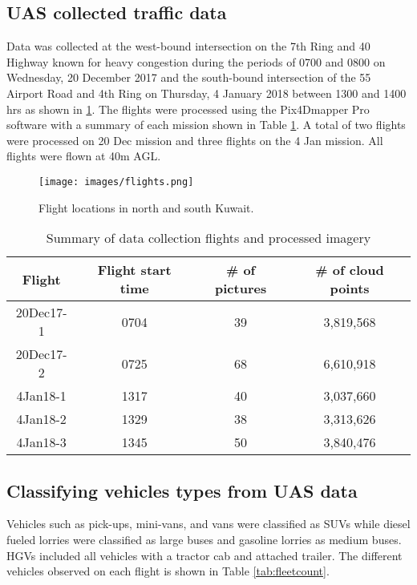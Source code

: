 \documentclass[preprint,12pt,a4paper,authoryear]{elsarticle}
\begin{document}
\begin{linenumbers}
\subsection{UAS collected traffic data}
Data was collected at the west-bound intersection on the 7th Ring and 40 Highway known for heavy congestion during the periods of 0700 and 0800 on Wednesday, 20 December 2017 and the south-bound intersection of the 55 Airport Road and 4th Ring on Thursday, 4 January 2018 between 1300 and 1400 hrs as shown in \ref{fig:flights}. The flights were processed using the Pix4Dmapper Pro software with a summary of  each mission shown in Table \ref{tb:flightdata}. A total of two flights were processed on 20 Dec mission and three flights on the 4 Jan mission. All flights were flown at 40m AGL.

\begin{figure}[H]
\texttt{[image: images/flights.png]} 
\caption[Flight locations]{Flight locations in north and south Kuwait.}
\label{fig:flights}
\end{figure}


\begin{table}[H]
\centering
\caption{Summary of data collection flights and processed imagery}
\label{tb:flightdata}
\begin{tabular}{@{}cccc@{}}
\toprule
\textbf{Flight} & \textbf{Flight start time} & \textbf{\# of pictures} & \textbf{\# of cloud points} \\ \midrule
20Dec17-1 & 0704 & 39 & 3,819,568 \\
20Dec17-2 & 0725 & 68 & 6,610,918 \\
4Jan18-1 & 1317 & 40 & 3,037,660 \\
4Jan18-2 & 1329 & 38 & 3,313,626 \\
4Jan18-3 & 1345 & 50 & 3,840,476 \\ \bottomrule
\end{tabular}
\end{table}


\subsection{Classifying vehicles types from UAS data}
Vehicles such as pick-ups, mini-vans, and vans were classified as SUVs while diesel fueled lorries were classified as large buses and gasoline lorries as medium buses. HGVs included all vehicles with a tractor cab and attached trailer. The different vehicles observed on each flight is shown in Table \ref{tab:fleetcount}.


\end{linenumbers}
\end{document}

